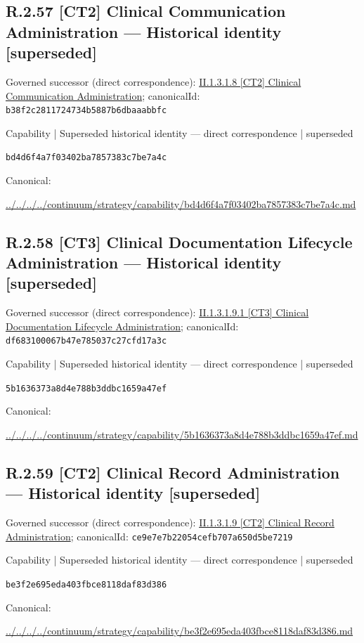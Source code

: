 \documentclass[10pt,a4paper]{article}
\begin{document}
\subsection*{R.2.57 [CT2] Clinical Communication Administration — Historical identity [superseded]}
Governed successor (direct correspondence): \hyperref[element-b38f2c2811724734b5887b6dbaaabbfc]{II.1.3.1.8 [CT2] Clinical Communication Administration}; canonicalId: \texttt{b38f2c2811724734b5887b6dbaaabbfc}\par
\label{element-bd4d6f4a7f03402ba7857383c7be7a4c}
{\small Capability | Superseded historical identity — direct correspondence | superseded}\par
\texttt{bd4d6f4a7f03402ba7857383c7be7a4c}\par
Canonical: \par
{\footnotesize\url{../../../../continuum/strategy/capability/bd4d6f4a7f03402ba7857383c7be7a4c.md}}\par
\subsection*{R.2.58 [CT3] Clinical Documentation Lifecycle Administration — Historical identity [superseded]}
Governed successor (direct correspondence): \hyperref[element-df683100067b47e785037c27cfd17a3c]{II.1.3.1.9.1 [CT3] Clinical Documentation Lifecycle Administration}; canonicalId: \texttt{df683100067b47e785037c27cfd17a3c}\par
\label{element-5b1636373a8d4e788b3ddbc1659a47ef}
{\small Capability | Superseded historical identity — direct correspondence | superseded}\par
\texttt{5b1636373a8d4e788b3ddbc1659a47ef}\par
Canonical: \par
{\footnotesize\url{../../../../continuum/strategy/capability/5b1636373a8d4e788b3ddbc1659a47ef.md}}\par
\subsection*{R.2.59 [CT2] Clinical Record Administration — Historical identity [superseded]}
Governed successor (direct correspondence): \hyperref[element-ce9e7e7b22054cefb707a650d5be7219]{II.1.3.1.9 [CT2] Clinical Record Administration}; canonicalId: \texttt{ce9e7e7b22054cefb707a650d5be7219}\par
\label{element-be3f2e695eda403fbce8118daf83d386}
{\small Capability | Superseded historical identity — direct correspondence | superseded}\par
\texttt{be3f2e695eda403fbce8118daf83d386}\par
Canonical: \par
{\footnotesize\url{../../../../continuum/strategy/capability/be3f2e695eda403fbce8118daf83d386.md}}\par
\end{document}
